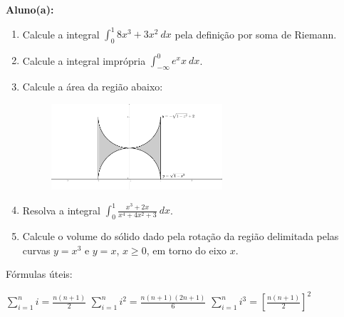 \documentclass[a4paper,5pt]{amsbook}
\newcommand{\ds}{\displaystyle}
\begin{document}
\vspace{0.5cm}
{\bf Aluno(a):}\dotfill{}  %

\vspace{0.2cm}
\begin{enumerate}
	\vspace{0.5cm}
	\item Calcule a integral $\ds\int_0^1 8x^3 + 3x^2\ dx$ pela defini\c{c}\~ao por soma de Riemann.

	\vspace{0.5cm}
	\item Calcule a integral impr\'opria $\ds\int_{-\infty}^0 e^x x\ dx$.

	\vspace{0.5cm}
	\item Calcule a \'area da regi\~ao abaixo:
		\begin{figure}[h]
			\centering
			\includegraphics[width=0.6\textwidth]{q3.pdf}
		\end{figure}

	\vspace{0.5cm}
	\item Resolva a integral $\ds\int_0^1 \frac{x^3 + 2x}{x^4+4x^2+3}\ dx$.

	\vspace{0.5cm}
	\item Calcule o volume do s\'olido dado pela rota\c{c}\~ao da regi\~ao delimitada
		pelas curvas $y = x^3$ e $y = x$, $x \ge 0$, em torno do eixo $x$.
\end{enumerate}

\vfill{}
F\'ormulas \'uteis:

$\ds\sum_{i=1}^n i = \frac{n(n+1)}{2}$\hspace{2cm}
$\ds\sum_{i=1}^n i^2 = \frac{n(n+1)(2n+1)}{6}$\hspace{2cm}
$\ds\sum_{i=1}^n i^3 = {\left[\frac{n(n+1)}{2}\right]}^2$
\end{document}
